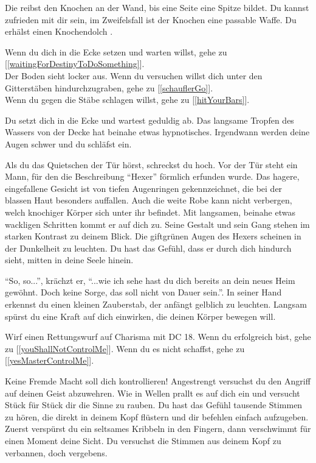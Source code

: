 
Die reibst den Knochen an der Wand, bis eine Seite eine Spitze bildet. Du kannst zufrieden mit dir sein, im Zweifelsfall ist der Knochen eine passable Waffe.
Du erhälst einen Knochendolch .

Wenn du dich in die Ecke setzen und warten willst, gehe zu [\ref{waitingForDestinyToDoSomething}].
\\Der Boden sieht locker aus. Wenn du versuchen willst dich unter den Gitterstäben hindurchzugraben, gehe zu [\ref{schauflerGo}].
\\Wenn du gegen die Stäbe schlagen willst, gehe zu [\ref{hitYourBars}].


Du setzt dich in die Ecke und wartest geduldig ab. Das langsame Tropfen des Wassers von der Decke hat beinahe etwas hypnotisches. Irgendwann werden deine Augen schwer und du schläfst ein.

Als du das Quietschen der Tür hörst, schreckst du hoch. Vor der Tür steht ein Mann, für den die Beschreibung ``Hexer'' förmlich erfunden wurde. Das hagere, eingefallene Gesicht ist von tiefen Augenringen gekennzeichnet, die bei der blassen Haut besonders auffallen. Auch die weite Robe kann nicht verbergen, welch knochiger Körper sich unter ihr befindet. Mit langsamen, beinahe etwas wackligen Schritten kommt er auf dich zu. Seine Gestalt und sein Gang stehen im starken Kontrast zu deinem Blick. Die giftgrünen Augen des Hexers scheinen in der Dunkelheit zu leuchten. Du hast das Gefühl, dass er durch dich hindurch sieht, mitten in deine Seele hinein.

``So, so...'', krächzt er, ``...wie ich sehe hast du dich bereits an dein neues Heim gewöhnt. Doch keine Sorge, das soll nicht von Dauer sein.''. In seiner Hand erkennst du einen kleinen Zauberstab, der anfängt gelblich zu leuchten. Langsam spürst du eine Kraft auf dich einwirken, die deinen Körper bewegen will.

Wirf einen Rettungswurf auf Charisma mit DC 18. Wenn du erfolgreich bist, gehe zu [\ref{youShallNotControlMe}]. Wenn du es nicht schaffst, gehe zu [\ref{yesMasterControlMe}].


Keine Fremde Macht soll dich kontrollieren! Angestrengt versuchst du den Angriff auf deinen Geist abzuwehren. Wie in Wellen prallt es auf dich ein und versucht Stück für Stück dir die Sinne zu rauben. Du hast das Gefühl tausende Stimmen zu hören, die direkt in deinem Kopf flüstern und dir befehlen einfach aufzugeben. Zuerst verspürst du ein seltsames Kribbeln in den Fingern, dann verschwimmt für einen Moment deine Sicht. Du versuchst die Stimmen aus deinem Kopf zu verbannen, doch vergebens.

